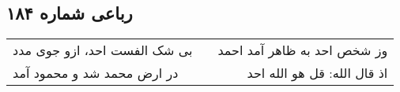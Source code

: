 \begin{center}
\section*{رباعی شماره ۱۸۴}
\label{sec:sh184}
\begin{longtable}{l p{0.5cm} r}
بی شک الفست احد، ازو جوی مدد
&&
وز شخص احد به ظاهر آمد احمد
\\
در ارض محمد شد و محمود آمد
&&
اذ قال الله: قل هو الله احد
\\
\end{longtable}
\end{center}
